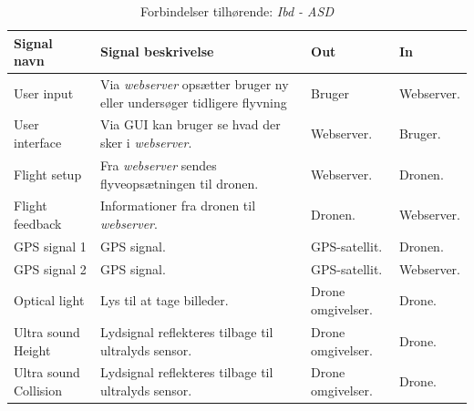 \begin{table}[H]
	\centering
		\begin{tabular}{|p{2.6 cm}|p{4.9 cm}|p{2.5 cm}|p{2.5 cm}|} 
		\hline
			\textbf{Signal navn} 	& \textbf{Signal beskrivelse}		& \textbf{Out} 				& \textbf{In}     \\ \hline
			User input 			& Via \textit{webserver} opsætter \newline bruger ny eller undersøger tidligere flyvning & Bruger 		& Webserver.			    \\ \hline
			User interface 		& Via GUI kan bruger se hvad der sker i \textit{webserver}.	& Webserver.			& Bruger.				\\ \hline
			Flight setup		& Fra \textit{webserver} sendes \newline flyveopsætningen til dronen.	& Webserver.	& Dronen.	\\ \hline
			Flight feedback		& Informationer fra dronen \newline til \textit{webserver}.	& 	Dronen.		& Webserver.			    \\ \hline
			GPS signal 1		& GPS signal.	& GPS-satellit.			& Dronen.				\\ \hline
			GPS signal 2		& GPS signal.	& GPS-satellit.				& Webserver.	\\ \hline  
			Optical light		& Lys til at tage billeder.	& Drone \newline omgivelser.				& Drone.	\\ \hline 
			Ultra sound \newline Height		& Lydsignal reflekteres tilbage til ultralyds sensor.	& Drone \newline omgivelser.				& Drone.	\\ \hline 
			Ultra sound \newline Collision		& Lydsignal reflekteres tilbage til ultralyds sensor.	& Drone \newline omgivelser.				& Drone.	\\ \hline 
		\end{tabular}
	\caption{Forbindelser tilhørende: \textit{Ibd - ASD}}
	\label{tab:IBD1}
\end{table}

